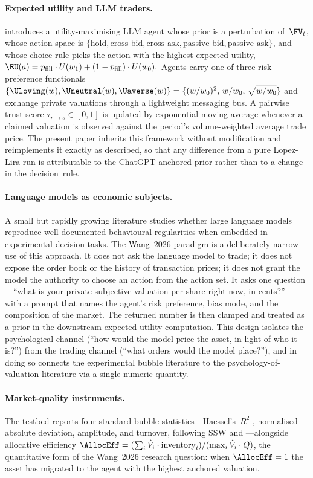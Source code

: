 \paragraph{Expected utility and LLM traders.}
\citet{lopezlira2025llm} introduces a utility-maximising LLM agent
whose prior is a perturbation of~$\FV_t$, whose action space is
$\{\text{hold},\text{cross bid},\text{cross ask},\text{passive bid},\text{passive ask}\}$,
and whose choice rule picks the action with the highest expected
utility,
$
\EU(a)=p_{\text{fill}}\cdot U(w_1)+(1-p_{\text{fill}})\cdot U(w_0).
$
Agents carry one of three risk-preference functionals
$\{\Uloving(w),\Uneutral(w),\Uaverse(w)\}=
\{(w/w_0)^2,\,w/w_0,\,\sqrt{w/w_0}\}$ and exchange private valuations
through a lightweight messaging bus. A pairwise trust score
$\tau_{r\to s}\in[0,1]$ is updated by exponential moving average
whenever a claimed valuation is observed against the period's
volume-weighted average trade price. The present paper inherits
this framework without modification and reimplements it exactly as
described, so that any difference from a pure Lopez-Lira run is
attributable to the ChatGPT-anchored prior rather than to a change
in the decision~rule.

\paragraph{Language models as economic subjects.}
A small but rapidly growing literature studies whether large language
models reproduce well-documented behavioural regularities when
embedded in experimental decision tasks. The Wang~2026 paradigm is a
deliberately narrow use of this approach. It does not ask the
language model to trade; it does not expose the order book or the
history of transaction prices; it does not grant the model the
authority to choose an action from the action set. It asks one
question---``what is your private subjective valuation per share
right now, in cents?''---with a prompt that names the agent's risk
preference, bias mode, and the composition of the market. The
returned number is then clamped and treated as a prior in the
downstream expected-utility computation. This design isolates the
psychological channel (``how would the model price the asset, in
light of who it is?'') from the trading channel (``what orders
would the model place?''), and in doing so connects the experimental
bubble literature to the psychology-of-valuation
literature via a single numeric quantity.

\paragraph{Market-quality instruments.} The testbed reports four
standard bubble statistics---Haessel's~$R^2$
\citep{haessel1978measuring}, normalised absolute deviation,
amplitude, and turnover, following SSW and
\citet{stockl2010bubble}---alongside allocative efficiency
$\AllocEff=(\sum_i \hat{V}_i\cdot\text{inventory}_i)/(\max_i\hat{V}_i\cdot Q)$,
the quantitative form of the Wang~2026 research question: when
$\AllocEff=1$ the asset has migrated to the agent with the highest
anchored valuation.
